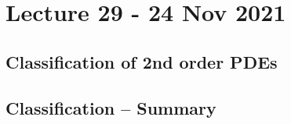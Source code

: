 \section{Lecture 29 - 24 Nov 2021}
\subsection{Classification of 2nd order PDEs}
\subsection{Classification -- Summary}

